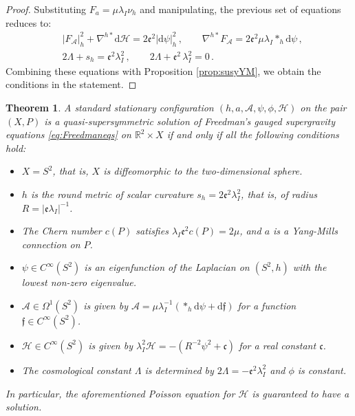 \documentclass[10pt,a4paper,twoside,reqno]{amsart}
\theoremstyle{plain}
\newtheorem{thm}{Theorem}[section]
\theoremstyle{definition}
\theoremstyle{remark}
\def\dd{\mathrm{d}}
\def\cH{\mathcal{H}}
\def\cA{\mathcal{A}}
\def\cH{\mathcal{H}}
\def\dd{\mathrm{d}}
\def\frc{\mathfrak{F}}
\def\frc{\mathfrak{c}}
\begin{document}
\begin{proof}
\noindent
Substituting $F_a = \mu\lambda_I \nu_h$ and manipulating, the previous set of equations reduces to:
\begin{eqnarray*}
& \vert F_{\cA}\vert^2_{h} + \nabla^{h\ast}\dd \cH     =   2 \mathfrak{e}^2 \vert \dd \psi\vert^2_h \, , \qquad \nabla^{h\ast} F_{\cA}   =     2\mathfrak{e}^2\mu \lambda_I \ast_h \dd\psi\, ,\\
&  2\Lambda + s_h = \mathfrak{e}^2 \lambda_I^2\, , \qquad    2 \Lambda  +  \mathfrak{e}^2\, \lambda_I^2 = 0\, .
\end{eqnarray*}
Combining these equations with Proposition \ref{prop:susyYM}, we obtain the conditions in the statement.
\end{proof}

\begin{thm}
\label{thm:NoGoFreedman}
A standard stationary configuration  $(h, a, \cA, \psi, \phi, \cH)$ on the pair $(X,P)$ is a quasi-supersymmetric solution of Freedman's gauged supergravity equations \eqref{eq:Freedmaneqs} on $\mathbb{R}^2 \times X$ if and only if all the following conditions hold:
\begin{itemize}
    \item $X = S^2$, that is, $X$ is diffeomorphic to the two-dimensional sphere.
    \item $h$ is the round metric of scalar curvature $s_h = 2 \mathfrak{e}^2 \lambda_I^2$, that is, of radius $R=\vert\mathfrak{e} \lambda_I\vert^{-1}$.
    \item The Chern number $c(P)$ satisfies $\lambda_I \mathfrak{e}^2 c(P) = 2\mu$, and $a$ is a Yang-Mills connection on $P$.  
    \item $\psi \in C^{\infty}(S^2)$ is an eigenfunction of the Laplacian on $(S^2,h)$ with the lowest non-zero eigenvalue. 
    \item $\cA \in \Omega^1(S^2)$ is given by $\cA = \mu \lambda^{-1}_I (\ast_h \dd \psi + \dd \mathfrak{f})$ for a function $\mathfrak{f}\in C^{\infty}(S^2)$.
    \item $\cH\in C^{\infty}(S^2)$ is given by $\lambda_I^2\cH = -(R^{-2}\psi^2 + \frc)$ for a real constant $\frc$.
    \item The cosmological constant $\Lambda$ is determined by $2\Lambda = -\mathfrak{e}^2 \lambda_I^2$ and $\phi$ is constant.
\end{itemize}
In particular, the aforementioned Poisson equation for $\cH$ is guaranteed to have a solution.
\end{thm}
\end{document}
